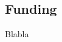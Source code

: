 \documentclass[oneside,twocolumn]{article}
\begin{document}
\subsection*{Funding}
Blabla







\end{document}
